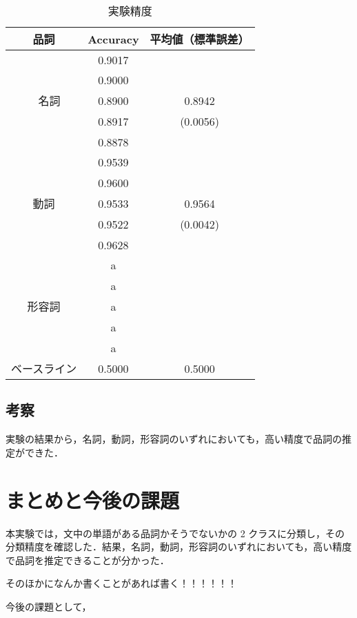 \documentclass[twocolumn]{jarticle}
\begin{document}
\begin{table}[htb]
\caption{実験精度}
  \begin{tabular}{| c |  c | c |} \hline
    品詞 & Accuracy & 平均値（標準誤差） \\ \hline \hline
    		& 0.9017 &  \\ %
    		& 0.9000 &  \\ 
　名詞　 	& 0.8900 & 0.8942 \\ 
        　　& 0.8917 & (0.0056) \\ 
     　　	& 0.8878 &  \\ \hline
%
              & 0.9539 &  \\ %
    　　 	& 0.9600 &  \\ 
    動詞 	& 0.9533 & 0.9564 \\  
        　　& 0.9522 & (0.0042) \\  
     　　	& 0.9628 &  \\ \hline
%
              & a &  \\   
    　　 	& a &  \\  
    形容詞 	& a &  \\  
        　　& a &  \\ 
     　　	& a &  \\ \hline
%
    ベースライン & 0.5000 & 0.5000 \\  \hline
  \end{tabular}
  \label{tb:2}
\end{table}



 \subsection{考察}
 実験の結果から，名詞，動詞，形容詞のいずれにおいても，高い精度で品詞の推定ができた．

\section{まとめと今後の課題}
本実験では，文中の単語がある品詞かそうでないかの 2 クラスに分類し，その分類精度を確認した．結果，名詞，動詞，形容詞のいずれにおいても，高い精度で品詞を推定できることが分かった．
\par
そのほかになんか書くことがあれば書く！！！！！！
\par
今後の課題として，



\end{document}
